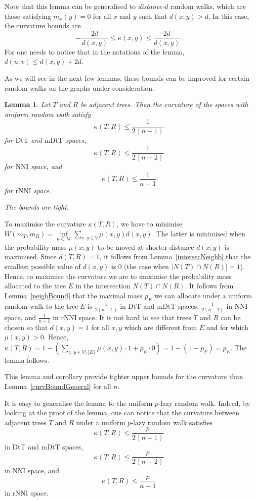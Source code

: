 \documentclass{amsart}
\newtheorem{lemma}{Lemma}
\newcommand{\dts}{\mathrm{DtT}}
\newcommand{\nni}{\mathrm{NNI}}
\newcommand{\rnni}{\mathrm{rNNI}}
\newcommand{\mdts}{\mathrm{mDtT}}
\newcommand{\M}{\mathcal{M}}
\begin{document}
Note that this lemma can be generalised to {\em distance-$d$} random walks, which are those satisfying $m_x(y) = 0$ for all $x$ and $y$ such that $d(x,y) > d$.
In this case, the curvature bounds are
\[
-\dfrac{2d}{d(x,y)} \leq \kappa(x,y) \leq \dfrac{2d}{d(x,y)}.
\]
For one needs to notice that in the notations of the lemma, $d(u,v) \leq d(x,y) + 2d$.

As we will see in the next few lemmas, these bounds can be improved for certain random walks on the graphs under consideration.

\begin{lemma}\label{uniformUpper}
Let $T$ and $R$ be adjacent trees.
Then the curvature of the spaces with uniform random walk satisfy
\[
\kappa(T,R) \leq \dfrac{1}{2(n-1)}
\]
for $\dts$ and $\mdts$ spaces,
\[
\kappa(T,R) \leq \dfrac{1}{2(n-2)}
\]
for $\nni$ space, and
\[
\kappa(T,R) \leq \dfrac{1}{n-1}
\]
for $\rnni$ space.

The bounds are tight.
\end{lemma}

\proof
To maximise the curvature $\kappa(T,R)$, we have to minimise $W(m_T,m_R) = \inf\limits_{\mu\in\M} \sum\limits_{x,y\in V}\mu(x,y) d(x,y)$.
The latter is minimised when the probability mass $\mu(x,y)$ to be moved at shorter distance $d(x,y)$ is maximised.
Since $d(T,R) = 1$, it follows from Lemma~\ref{intersecNeighb} that the smallest possible value of $d(x,y)$ is $0$ (the case when $|N(T) \cap N(R)| = 1$).
Hence, to maximise the curvature we are to maximise the probability mass allocated to the tree $E$ in the intersection $N(T) \cap N(R)$.
It follows from Lemma~\ref{neighBound} that the maximal mass $p_E$ we can allocate under a uniform random walk to the tree $E$ is $\frac{1}{2(n-1)}$ in $\dts$ and $\mdts$ spaces, $\frac{1}{2(n-2)}$ in $\nni$ space, and $\frac{1}{n-1}$ in $\rnni$ space.
It is not hard to see that trees $T$ and $R$ can be chosen so that $d(x,y) = 1$ for all $x,y$ which are different from $E$ and for which $\mu(x,y) > 0$.
Hence, $\kappa(T, R) = 1 - (\sum\limits_{x,y\in V\setminus\{E\}}\mu(x,y)\cdot 1 + p_E \cdot 0) = 1 - (1-p_E) = p_E$.
The lemma follows.
\endproof

This lemma and corollary provide tighter upper bounds for the curvature than Lemma~\ref{curvBoundGeneral} for all $n$.

It is easy to generalise the lemma to the uniform $p$-lazy random walk.
Indeed, by looking at the proof of the lemma, one can notice that the curvature between adjacent trees $T$ and $R$ under a uniform $p$-lazy random walk satisfies
\[
\kappa(T,R) \leq \frac{p}{2(n-1)}
\]
in $\dts$ and $\mdts$ spaces,
\[
\kappa(T,R) \leq \frac{p}{2(n-2)}
\]
in $\nni$ space, and
\[
\kappa(T,R) \leq \frac{p}{n-1}
\]
in $\rnni$ space.
\end{document}
